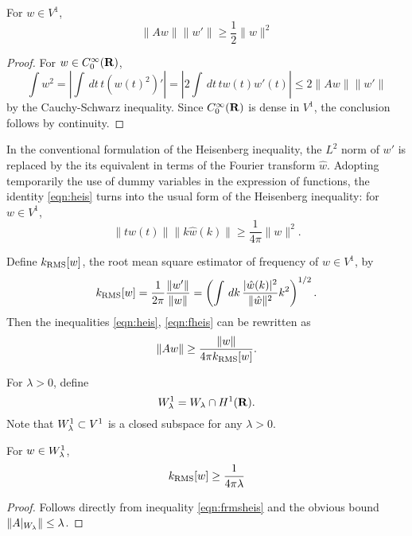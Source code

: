 \begin{proposition}
  \label{thm:heis}
For $w \in V^1$,
  \begin{equation}
    \label{eqn:heis}
    \|Aw\|\|w'\| \ge \frac{1}{2}\|w\|^2
  \end{equation}
\end{proposition}

\begin{proof}
  For $w \in C_0^{\infty}({\bf R})$,
  \[
    \int w^2 = \left|\int\,dt\, t (w(t)^2)' \right|= \left|2\int\,dt\,tw(t)w'(t)\right| \le
    2\|Aw\| \|w'\|
  \]
  by the Cauchy-Schwarz inequality. Since $C_0^{\infty}({\bf R})$ is dense
  in $V^1$, the conclusion follows by continuity.
\end{proof}

In the conventional formulation of the Heisenberg inequality, the $L^2$ norm of
$w'$ is replaced by the its equivalent in terms of the Fourier
transform $\hat{w}$. Adopting temporarily the use of dummy variables
in the expression of functions, the identity \ref{eqn:heis} turns into
the usual form of the Heisenberg inequality: for $w \in V^1$,
\begin{equation}
\label{eqn:fheis}
\|tw(t)\|\|k\hat{w}(k)\| \ge \frac{1}{4\pi}\|w\|^2.
\end{equation}

Define $k_{\rm RMS}[w]$, the root mean square estimator of frequency of $w
\in V^1$, by
\begin{equation}
  \label{eqn:krms}
  k_{\rm RMS}[w]=\frac{1}{2\pi}\frac{\|w'\|}{\|w\|} = \left(\int
    \,dk\,\frac{|\hat{w}(k)|^2}{\|\hat{w}\|^2} k^2\right)^{1/2}.
\end{equation}
Then the inequalities \ref{eqn:heis}, \ref{eqn:fheis} can be rewritten as
\begin{equation}
  \label{eqn:frmsheis}
  \|Aw\| \ge \frac{\|w\|}{4\pi k_{\rm RMS}[w]}.
\end{equation}

For $\lambda >0$, define
\begin{equation}
  \label{eqn:wlam1}
  W_{\lambda}^1 = W_{\lambda} \cap H^1({\bf R}).
\end{equation}
Note that $W_{\lambda}^1 \subset V^1$ is a closed subspace for any
$\lambda>0$.

\begin{proposition}
  \label{thm:klam}
  For $w \in W_{\lambda}^1$,
  \[
    k_{\rm RMS}[w] \ge \frac{1}{4 \pi \lambda}
  \]
\end{proposition}

\begin{proof}
  Follows directly from inequality \ref{eqn:frmsheis} and the obvious bound
  $\|A|_{W_{\lambda}}\|\le \lambda$.
\end{proof}

